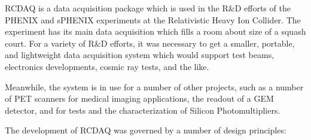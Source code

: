 \documentclass{article}[11pt]
\begin{document}
RCDAQ is a data acquisition package which is used in the R\&D efforts
of the PHENIX and sPHENIX experiments at the Relativistic Heavy Ion
Collider.  The experiment has its main data acquisition which fills a
room about size of a squash court. For a variety of R\&D efforts, it
was necessary to get a smaller, portable, and lightweight data
acquisition system which would support test beams, electronics
developments, cosmic ray tests, and the like.

Meanwhile, the system is in use for a number of other projects, such
as a number of PET scanners for medical imaging applications, the
readout of a GEM detector, and for tests and the characterization of
Silicon Photomultipliers.


The development of RCDAQ was governed by a number of design principles:
\end{document}
